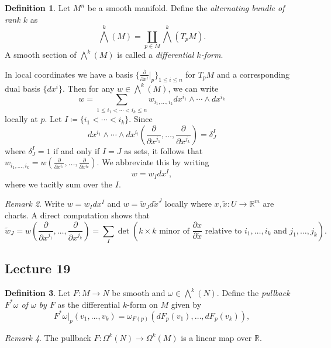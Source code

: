 \documentclass[10pt,letterpaper,cm]{nupset}
\theoremstyle{definition}
\newtheorem{definition}{Definition}[subsection]
\theoremstyle{theorem}
\theoremstyle{remark}
\newtheorem{remark}[definition]{Remark}
\newcommand{\R}{\mathbb R}
\newcommand{\1}{\mathbf{1}}
\newcommand{\0}{\vec 0}
\begin{document}
\begin{definition}
Let $M^n$ be a smooth manifold. Define the \textit{alternating bundle of rank $k$} as $$\bigwedge^k(M) = \coprod_{p\in M} \bigwedge^k(T_pM).  $$ A smooth section of $\bigwedge^k(M)$ is called a \textit{differential $k$-form}.
\end{definition}


In local coordinates we have a basis $\{\frac{\partial}{\partial{x^i}}\rvert_p\}_{1\leq i \leq n}$ for $T_pM$ and a corresponding dual basis $\{dx^i\}$. Then for any $w \in \bigwedge^k(M)$, we can write $$ w = \sum_{1\leq i_1 < \cdots < i_k \leq n}w_{i_1, \ldots, i_k} dx^{i_1} \wedge \cdots \wedge dx^{i_k} $$ locally at $p$. Let $I\coloneqq  \{i_1 < \cdots < i_k\}$. Since $$dx^{i_1} \wedge \cdots \wedge dx^{i_l}\left( \frac{\partial}{\partial{x^{j_1}}}, \ldots, \frac{\partial}{\partial{x^{j_k}}} \right) = \delta^I_J$$ where $\delta^I_J = 1$ if and only if $I = J$ as sets, it follows that
$w_{i_1, \ldots, i_k}  = w(\frac{\partial}{\partial{x^{i_1}}}, \ldots, \frac{\partial}{\partial{x^{i_k}}}).$ We abbreviate this by writing $$w = w_I dx^I,$$ where we tacitly sum over the $I$.


\begin{remark}
Write $w = w_Idx^I$ and $ w= \tilde{w}_J d\tilde{x}^J$ locally where $x, \tilde{x}: U \to \R^m$ are charts. A direct computation shows that $$\tilde{w}_J = w(\frac{\partial}{\partial{x^{j_1}}}, \ldots,  \frac{\partial}{\partial{x^{j_k}}}) = \sum_I \det(k \times k \text{ minor of }\frac{\partial{x}}{\partial{\tilde{x}}} \text{ relative to } i_1, \ldots, i_k \text{ and }j_1, \ldots, j_k). $$
\end{remark}

\subsection{Lecture 19}

\begin{definition}
Let $F: M \to N$ be smooth and $\omega \in \bigwedge^k(N)$. Define the \textit{pullback $F^{\ast}\omega$ of $\omega$ by $F$} as the differential $k$-form on $M$ given by $$F^{\ast} \omega\rvert_p(v_1, \ldots, v_k) = \omega_{F(p)}(dF_p(v_1), \ldots, dF_p(v_k)),$$
\end{definition}

\begin{remark}
The pullback $F : \Omega^k(N) \to \Omega^k(M)$ is a linear map over $\R$. 
\end{remark}
\end{document}
